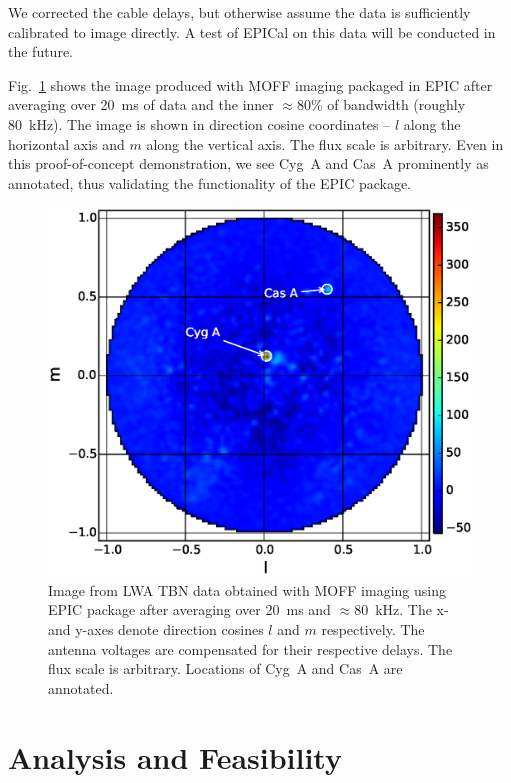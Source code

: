 \documentclass[a4paper,fleqn,usenatbib]{mnras}
\begin{document}
We corrected the cable delays, but otherwise assume the data is sufficiently 
calibrated to image directly. A test of EPICal on this data will be conducted 
in the future.

Fig.~\ref{fig:LWA-image} shows the image produced with MOFF imaging 
packaged in EPIC after averaging over 20~ms of data and the inner
$\approx 80$\% of bandwidth (roughly 80~kHz). The image is shown in direction 
cosine coordinates -- $l$ along the horizontal axis and $m$ along the vertical 
axis. The flux scale is arbitrary. Even in this proof-of-concept demonstration, 
we see Cyg~A and Cas~A prominently as annotated, thus validating the 
functionality of the EPIC package.

\begin{figure}
  \includegraphics[width=\columnwidth]{LWA_MOFF_bandavg_image_4_iterations_analytic_aperture}
  \caption{Image from LWA TBN data obtained with MOFF imaging using EPIC 
    package after averaging over 20~ms and $\approx 80$~kHz. The x- and y-axes
    denote direction cosines $l$ and $m$ respectively. The antenna voltages
    are compensated for their respective delays. The flux scale is arbitrary.
    Locations of Cyg~A and Cas~A are annotated.}
  \label{fig:LWA-image}
\end{figure}

\section{Analysis and Feasibility}\label{sec:analysis}
\end{document}
